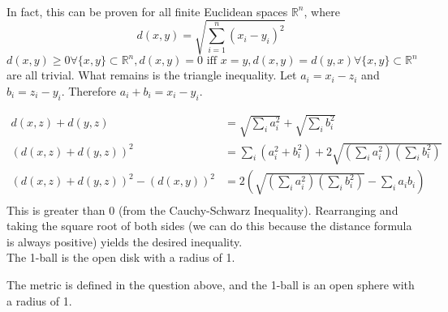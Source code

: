 
\begin{solution}
 \\In fact, this can be proven for all finite Euclidean spaces $\mathbb{R}^n$, where
 $$d(x,y) = \sqrt{\sum_{i=1}^n (x_i-y_i)^2}$$
 $d(x,y) \geq 0 \forall \{x,y\} \subset \mathbb{R}^n, d(x,y) = 0 \text{ iff } x = y, d(x,y) = d(y,x) \forall \{x,y\} \subset \mathbb{R}^n$ are all trivial. What remains is the triangle inequality.
 Let $a_i = x_i - z_i$ and $b_i = z_i - y_i$. Therefore $a_i + b_i = x_i - y_i$.
 
 
\begin{align*}
 d(x,z) + d(y,z) &= \sqrt{\sum_i a_i^2} + \sqrt{\sum_i b_i^2} \\
 (d(x,z) + d(y,z))^2 &= \sum_i(a_i^2 + b_i^2) + 2\sqrt{\left(\sum_i a_i^2\right)\left(\sum_i b_i^2\right)} \\
 (d(x,z)+d(y,z))^2 - (d(x,y))^2 &= 2\left(\sqrt{\left(\sum_i a_i^2\right)\left(\sum_i b_i^2\right)} - \sum_i a_i b_i\right) \\
\end{align*}
This is greater than 0 (from the Cauchy-Schwarz Inequality). Rearranging and taking the square root of both sides (we can do this because the distance formula is always positive) yields the desired inequality. \\
The 1-ball is the open disk with a radius of 1.
\end{solution}


\begin{solution}
 The metric is defined in the question above, and the 1-ball is an open sphere with a radius of 1.
\end{solution}


